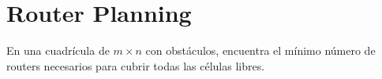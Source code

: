 \documentclass{article}
\begin{document}
\section*{Router Planning}
En una cuadr\'icula de $m \times n$ con obst\'aculos, encuentra el m\'inimo n\'umero de routers necesarios para cubrir todas las c\'elulas libres.
\end{document}
